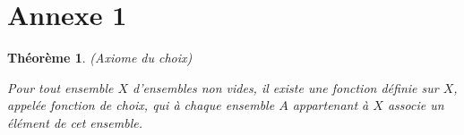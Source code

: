 \chapter*{Annexe 1}
\newtheorem{kkk}{Théorème}

\makeatletter
\renewcommand{\thesection}{\@arabic\c@section}
\makeatother

\setcounter{section}{0}

\begin{kkk}(Axiome du choix)
  \hfill

\noindent
  Pour tout ensemble $X$ d'ensembles non vides, il existe une fonction définie sur $X$, appelée fonction de choix, qui à chaque ensemble $A$ appartenant à $X$ associe un élément de cet ensemble.
  \label{axiome}
\end{kkk}

